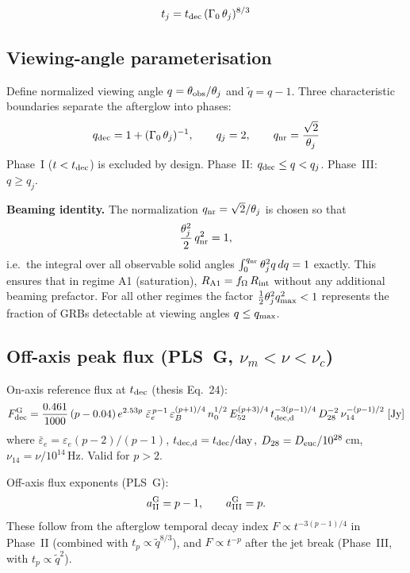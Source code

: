 \documentclass[11pt,a4paper]{article}
\begin{document}
\begin{equation}
t_j = t_{\rm dec}\,(\Gamma_0\,\theta_j)^{8/3}
\end{equation}

\subsection{Viewing-angle parameterisation}

\noindent Define normalized viewing angle $q = \theta_{\rm obs}/\theta_j$ and $\tilde{q}=q-1$.
Three characteristic boundaries separate the afterglow into phases:
\begin{equation}
q_{\rm dec} = 1 + (\Gamma_0\,\theta_j)^{-1}, \qquad q_j = 2, \qquad q_{\rm nr} = \frac{\sqrt{2}}{\theta_j}
\end{equation}
Phase~I ($t < t_{\rm dec}$) is excluded by design. Phase~II: $q_{\rm dec}\le q<q_j$. Phase~III: $q\ge q_j$.

\noindent\textbf{Beaming identity.} The normalization $q_{\rm nr}=\sqrt{2}/\theta_j$ is chosen so that
\[
\frac{\theta_j^2}{2}\,q_{\rm nr}^2 = 1,
\]
i.e.\ the integral over all observable solid angles $\int_0^{q_{\rm nr}}\theta_j^2 q\,dq = 1$ exactly.
This ensures that in regime A1 (saturation), $R_{\rm A1} = f_\Omega\,R_{\rm int}$ without any additional beaming prefactor.
For all other regimes the factor $\frac{1}{2}\theta_j^2 q_{\rm max}^2 < 1$ represents the fraction of GRBs detectable at viewing angles $q\le q_{\rm max}$.

\subsection{Off-axis peak flux (PLS~G, $\nu_m<\nu<\nu_c$)}

\noindent On-axis reference flux at $t_{\rm dec}$ (thesis Eq.~24):
\begin{equation}
F_{\rm dec}^{\rm G} = \frac{0.461}{1000}\,(p-0.04)\,e^{2.53p}\;
\bar{\varepsilon}_e^{\,p-1}\,\varepsilon_B^{(p+1)/4}\,
n_0^{1/2}\,E_{52}^{(p+3)/4}\,
t_{\rm dec,d}^{-3(p-1)/4}\,D_{28}^{-2}\,\nu_{14}^{-(p-1)/2}
\;[\text{Jy}]
\end{equation}
where $\bar{\varepsilon}_e=\varepsilon_e(p-2)/(p-1)$, $t_{\rm dec,d}=t_{\rm dec}/{\rm day}$, $D_{28}=D_{\rm euc}/10^{28}$\,cm, $\nu_{14}=\nu/10^{14}$\,Hz. Valid for $p>2$.

\noindent Off-axis flux exponents (PLS~G):
\[
a_{\rm II}^{\rm G} = p-1, \qquad a_{\rm III}^{\rm G} = p.
\]
These follow from the afterglow temporal decay index $F\propto t^{-3(p-1)/4}$ in Phase~II (combined with $t_p\propto\tilde{q}^{8/3}$), and $F\propto t^{-p}$ after the jet break (Phase~III, with $t_p\propto\tilde{q}^{2}$).
\end{document}
